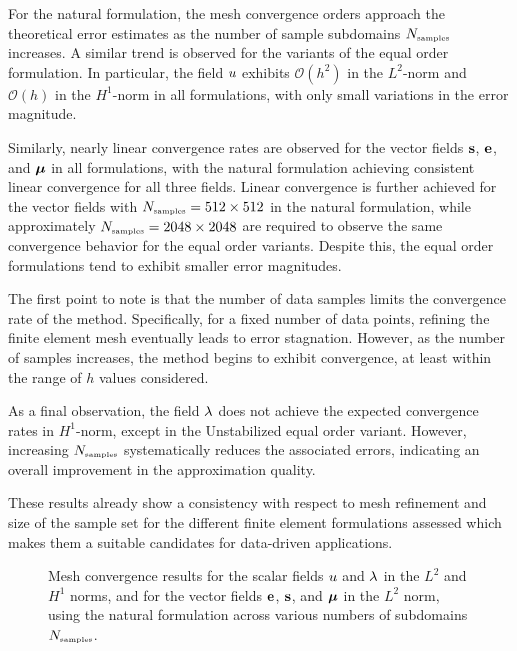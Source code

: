 For the natural formulation, the mesh convergence orders approach the theoretical error estimates as the number of sample subdomains $N_{\mbox{\tiny samples}}$ increases. A similar trend is observed for the variants of the equal order formulation. In particular, the field $u$ exhibits $\mathcal{O}(h^{2}) $ in the $L^{2}$-norm and $ \mathcal{O}(h) $ in the $H^{1}$-norm in all formulations, with only small variations in the error magnitude.

Similarly, nearly linear convergence rates are observed for the vector fields $\mathbf{s}$, $\mathbf{e}$, and $\boldsymbol{\mu}$ in all formulations, with the natural formulation achieving consistent linear convergence for all three fields. Linear convergence is further achieved for the vector fields with $N_{\mbox{\tiny samples}} = 512 \times 512$ in the natural formulation, while approximately $N_{\mbox{\tiny samples}}  = 2048 \times 2048$ are required to observe the same convergence behavior for the equal order variants. Despite this, the equal order formulations tend to exhibit smaller error magnitudes.

The first point to note is that the number of data samples limits the convergence rate of the method. Specifically, for a fixed number of data points, refining the finite element mesh eventually leads to error stagnation. However, as the number of samples increases, the method begins to exhibit convergence, at least within the range of $h$ values considered.

As a final observation, the field $\lambda$ does not achieve the expected convergence rates in $ H^{1} $-norm, except in the Unstabilized equal order variant. However, increasing $N_{\mbox{\tiny samples}}$ systematically reduces the associated errors, indicating an overall improvement in the approximation quality.

These results already show a consistency with respect to mesh refinement and size of
the sample set for the different finite element formulations assessed which makes them 
a suitable candidates for data-driven applications. 

\begin{figure}[h!]
	\centering
	\caption{Mesh convergence results for the scalar fields $u$ and $\lambda$ in the $L^2$ and $H^1$ norms, and for the vector fields $\mathbf{e}$, $\mathbf{s}$, and $\boldsymbol{\mu}$ in the $L^2$ norm, using the natural
	 formulation across various numbers of subdomains $N_{\mbox{\tiny samples}}$.}
	\def\svgwidth{1.0\columnwidth}
	
	\label{fig:quadricula_convergence_natural_linear}
\end{figure}


